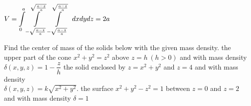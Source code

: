 \begin{Answer}
    $V = \displaystyle\int\limits_0^a \int\limits_{-\sqrt{\frac{a-z}{a}}}^{\sqrt{\frac{a-z}{a}}} \int\limits_{-\sqrt{\frac{a-z}{a}}}^{\sqrt{\frac{a-z}{a}}} \ dx dy dz =2a$
\end{Answer}

\begin{Exercise} Find the center of mass of the solids below with the given mass density.
    \Question[difficulty = 3] the upper part of the cone $x^2 + y^2 = z^2$ above $z=h \ (h>0)$ and with mass density $\delta(x,y,z) = 1 - \dfrac{z}{h}$ 
    \Question[difficulty = 2]  the solid enclosed by $z=x^2+y^2$ and $z=4$ and with mass density \\ $\delta(x,y,z) = k \sqrt{x^2 + y^2}$. 
    \Question[difficulty = 3] the surface $x^2 + y^2 - z^2 = 1$ between $z=0$ and $z=2$ and with mass density $\delta = 1$ 
\end{Exercise}

